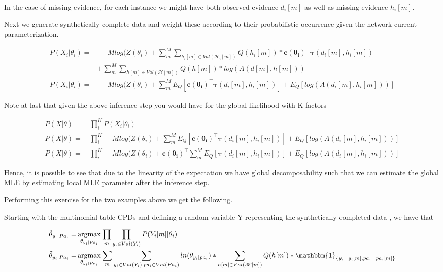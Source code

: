 \documentclass[11pt]{article}
\begin{document}
\begin{article}
In the case of missing evidence, for each instance we might have
both observed evidence \(d_i[m]\) as well as missing evidence \(h_i[m]\).

Next we generate synthetically complete data and weight these
according to their probabilistic occurrence given the network
current parameterization.

\begin{align} \label{eq:complete-exponential-family-likelihood}
P(X_i|\theta_i) =& \ - Mlog(Z(\theta_i) + \sum_m^M \sum_{h_i[m] \in Val(\mathscr{H}_i[m])} Q(h_i[m]) * \mathbf{c(\theta_i)}^\intercal \mathbf{\tau}(d_i[m], h_i[m])\\
            & + \sum_m^M \sum_{h[m] \in Val(\mathscr{H}[m])} Q(h[m]) * log(A(d[m], h[m]))  \nonumber \\
P(X_i|\theta_i) =& \ - Mlog(Z(\theta_i) + \sum_m^M E_Q[\mathbf{c(\theta_i)}^\intercal \mathbf{\tau}(d_i[m], h_i[m])] + E_Q[log(A(d_i[m], h_i[m]))]
\end{align}

Note at last that given the above inference step you would have
for the global likelihood with K factors

\begin{align} \label{eq:global-likelihood}
P(X|\theta) =& \ \prod_i^K P(X_i|\theta_i) \nonumber \\
P(X|\theta) =& \ \prod_i^K - Mlog(Z(\theta_i) + \sum_m^M E_Q[\mathbf{c(\theta_i)}^\intercal \mathbf{\tau}(d_i[m], h_i[m])] + E_Q[log(A(d_i[m], h_i[m]))] \\
P(X|\theta) =& \ \prod_i^K - Mlog(Z(\theta_i) + \mathbf{c(\theta_i)}^\intercal \sum_m^M E_Q[\mathbf{\tau}(d_i[m], h_i[m])] + E_Q[log(A(d_i[m], h_i[m]))] \nonumber  
\end{align}

Hence, it is possible to see that due to the linearity of the
expectation we have global decomposability such that we can
estimate the global MLE by estimating local MLE parameter after
the inference step.

Performing this exercise for the two examples above we get the
following.

Starting with the multinomial table CPDs and defining a random
variable Y representing the synthetically completed data \(<H, D>\),
we have that

\begin{align} \label{eq:solution}
\tilde{\theta}_{y_i | Pa_i} =& \operatorname*{argmax}_{\theta_{y_i | Pa_i}}  \prod_m \prod_{y_i \in Val(Y_i)} P(Y_i[m]|\theta_i) \nonumber  \\
\tilde{\theta}_{y_i | Pa_i} =& \operatorname*{argmax}_{\theta_{y_i | Pa_i}} \sum_m \sum_{y_i \in Val(Y_i), pa_i \in Val(Pa_i)} ln(\theta_{y_i | pa_i}) * \sum_{h[m] \in Val(\mathscr{H}[m])} Q(h[m]) * \mathbbm{1}_{\{y_i = y_i[m], pa_i = pa_i[m]\}}
\end{align}


\end{article}
\end{document}
